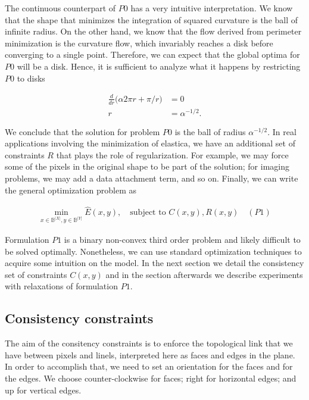 The continuous counterpart of $P0$ has a very intuitive interpretation. We know that the shape that minimizes the integration of squared curvature is the ball of infinite radius. On the other hand, we know that the flow derived from perimeter minimization is the curvature flow, which invariably reaches a disk before converging to a single point. Therefore, we can expect that the global optima for $P0$ will be a disk. Hence, it is sufficient to analyze what it happens by restricting $P0$ to disks

\begin{align*}
	\frac{d}{dr}\big( \alpha 2\pi r + \pi/r \big) &= 0\\
	r &= \alpha^{-1/2}.
\end{align*}  

We conclude that the solution for problem $P0$ is the ball of radius $\alpha^{-1/2}$. In real applications involving the minimization of elastica, we have an additional set of constraints $R$ that plays the role of regularization. For example, we may force some of the pixels in the original shape to be part of the solution; for imaging problems, we may add a data attachment term, and so on. Finally, we can write the general optimization problem as

\begin{align*}
	\min_{x \in \mathbb{B}^{|X|}, y \in \mathbb{B}^{|Y|}}{\hat{E}(x,y)}, \quad \text{subject to } C(x,y), R(x,y) \quad (P1)
\end{align*}

	Formulation $P1$ is a binary non-convex third order problem and likely difficult to be solved optimally. Nonetheless, we can use standard optimization techniques to acquire some intuition on the model. In the next section we detail the consistency set of constraints $C(x,y)$ and in the section afterwards we describe experiments with relaxations of formulation $P1$.
	
\subsection{Consistency constraints}

The aim of the consitency constraints is to enforce the topological link that we have between pixels and linels, interpreted here as faces and edges in the plane. In order to accomplish that, we need to set an orientation for the faces and for the edges. We choose counter-clockwise for faces; right for horizontal edges; and up for vertical edges.


